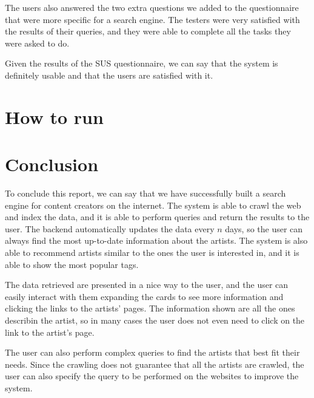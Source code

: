 \documentclass[tikz,14pt]{article}
\begin{document}
The users also answered the two extra questions we added to the questionnaire that were more specific for a search engine.
The testers were very satisfied with the results of their queries, and they were able to complete all the tasks they were asked to do.

Given the results of the SUS questionnaire, we can say that the system is definitely usable and that the users are satisfied with it.


\section{How to run} \label{sec:howtorun}


\section{Conclusion}

To conclude this report, we can say that we have successfully built a search engine for content creators on the internet.
The system is able to crawl the web and index the data, and it is able to perform queries and return the results to the user.
The backend automatically updates the data every $n$ days, so the user can always find the most up-to-date information about the artists.
The system is also able to recommend artists similar to the ones the user is interested in, and it is able to show the most popular tags.

The data retrieved are presented in a nice way to the user, and the user can easily interact with them expanding the cards
to see more information and clicking the links to the artists' pages.
The information shown are all the ones describin the artist, so in many cases the user does not even need to click on the link to the artist's page.

The user can also perform complex queries to find the artists that best fit their needs.
Since the crawling does not guarantee that all the artists are crawled, the user can also specify the query to be performed on the websites to improve the system.




\clearpage
\end{document}
